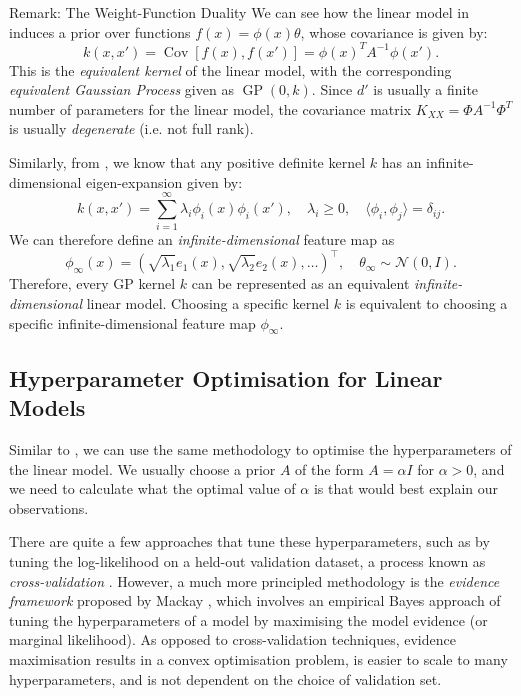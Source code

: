 \begin{lightgraybox}{Remark: The Weight-Function Duality}
We can see how the linear model in  induces a prior over functions $f(x) = \phi(x) \theta$, whose covariance is given by:
\[
k(x, x') = \operatorname{Cov}[f(x), f(x')] = \phi(x)^T A^{-1} \phi(x').
\]
This is the \emph{equivalent kernel} of the linear model, with the corresponding \emph{equivalent Gaussian Process} given as $\operatorname{GP}(0, k)$. Since $d'$ is usually a finite number of parameters for the linear model, the covariance matrix $K_{XX} = \Phi A^{-1} \Phi^T$ is usually \emph{degenerate} (i.e. not full rank).


Similarly, from , we know that any positive definite kernel $k$ has an infinite-dimensional eigen-expansion given by:
\[
k(x, x') = \sum_{i=1}^{\infty} \lambda_i \phi_i(x) \phi_i(x'), \quad \lambda_i \geq 0, \quad \langle \phi_i, \phi_j \rangle = \delta_{ij}.
\]
We can therefore define an \emph{infinite-dimensional} feature map as
\[
\phi_{\infty}(x) = \left(\sqrt{\lambda_1} e_1(x), \sqrt{\lambda_2} e_2(x), \ldots\right)^{\top}, \quad {\theta}_{\infty} \sim \mathcal{N}(0, I) .
\]
Therefore, every GP kernel $k$ can be represented as an equivalent \emph{infinite-dimensional} linear model. Choosing a specific kernel $k$ is equivalent to choosing a specific infinite-dimensional feature map $\phi_{\infty}$.
\end{lightgraybox}

\subsection{Hyperparameter Optimisation for Linear Models}

Similar to , we can use the same methodology to optimise the hyperparameters of the linear model. We usually choose a prior $A$ of the form $A=\alpha I$ for $\alpha > 0$, and we need to calculate what the optimal value of $\alpha$ is that would best explain our observations. 

There are quite a few approaches that tune these hyperparameters, such as by tuning the log-likelihood on a held-out validation dataset, a process known as \emph{cross-validation} \citep{ritter2018scalable, foong2019between}. However, a much more principled methodology is the \emph{evidence framework} proposed by Mackay \citep{mackay1992bayesian}, which involves an empirical Bayes approach of tuning the hyperparameters of a model by maximising the model evidence (or marginal likelihood). As opposed to cross-validation techniques, evidence maximisation results in a convex optimisation problem, is easier to scale to many hyperparameters, and is not dependent on the choice of validation set. 


